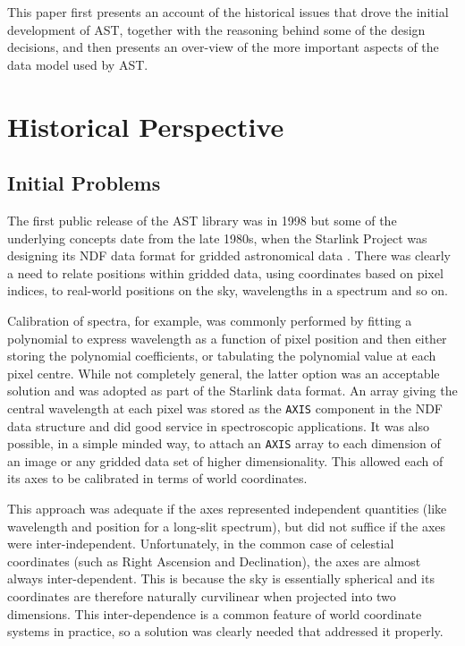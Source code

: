 \documentclass[final,authoryear,5p,times,twocolumn]{elsarticle}
\begin{document}
This paper first presents an account of the historical issues that drove
the initial development of AST, together with the reasoning behind some
of the design decisions, and then presents an over-view of the more
important aspects of the data model used by AST.

\section{Historical Perspective}

\subsection{Initial Problems}

The first public release of the AST library was in 1998
\citep{1998StarB..20....6L,1998StarB..20....7D} but some of the
underlying concepts date from the late 1980s, when the Starlink
Project was designing its NDF data format for gridded astronomical
data \citep[see][and references therein]{2015Jenness}. There was clearly a need to relate positions
within gridded data, using coordinates based on pixel indices, to
real-world positions on the sky, wavelengths in a spectrum and so
on.

Calibration of spectra, for example, was commonly performed by fitting
a polynomial to express wavelength as a function of pixel position and
then either storing the polynomial coefficients, or tabulating the
polynomial value at each pixel centre. While not completely general,
the latter option was an acceptable solution and was adopted as part
of the Starlink data format. An array giving the central wavelength at
each pixel was stored as the \texttt{AXIS} component in the NDF data
structure and did good service in spectroscopic applications. It was
also possible, in a simple minded way, to attach an \texttt{AXIS}
array to each dimension of an image or any gridded data set of higher
dimensionality. This allowed each of its axes to be calibrated in
terms of world coordinates.

This approach was adequate if the axes represented independent
quantities (like wavelength and position for a long-slit spectrum),
but did not suffice if the axes were inter-independent. Unfortunately,
in the common case of celestial coordinates (such as Right Ascension
and Declination), the axes are almost always inter-dependent. This is
because the sky is essentially spherical and its coordinates are
therefore naturally curvilinear when projected into two
dimensions. This inter-dependence is a common feature of world
coordinate systems in practice, so a solution was clearly needed that
addressed it properly.
\end{document}
